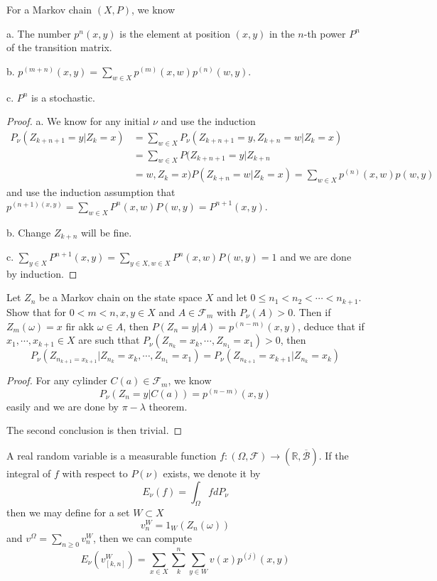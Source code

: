 \documentclass[lang=en, color=blue, ]{elegantbook}
\newcommand{\F}{\mathcal{F}}
\newcommand{\R}{\mathbb{R}}
\begin{document}
\begin{lemma}
    For a Markov chain $(X,P)$, we know\par
    a. The number $p^n(x,y)$ is the element at position $(x,y)$ in the $n$-th power $P^n$ of the transition matrix.\par
    b. $p^{(m+n)}(x,y) = \sum\limits_{w\in X}p^{(m)}(x,w)p^{(n)}(w,y)$.\par
    c. $P^n$ is a stochastic.
\end{lemma}
\begin{proof}
    a. We know for any initial $\nu$ and use the induction
    \[
    \begin{aligned}
    P_{\nu}(Z_{k+n+1} = y|Z_k = x) &= \sum\limits_{w\in X}P_{\nu}(Z_{k+n+1} =y, Z_{k+n} = w |Z_k = x) \\ &= \sum\limits_{w\in X}P(Z_{k+n+1} = y|Z_{k+n} \\ &= w, Z_k = x)P(Z_{k+n} = w|Z_k = x) = \sum\limits_{w\in X}p^{(n)}(x,w)p(w,y)
    \end{aligned}
    \]
    and use the induction assumption that $p^{(n+1)(x,y)} = \sum\limits_{w\in X} P^n(x,w)P(w,y) = P^{n+1}(x,y)$.\par
    b. Change $Z_{k+n}$ will be fine.\par
    c. $\sum\limits_{y\in X}P^{n+1}(x,y) = \sum\limits_{y\in X, w\in X} P^{n}(x,w)P(w,y) = 1$ and we are done by induction.
\end{proof}

\begin{proposition}
    Let $Z_n$ be a Markov chain on the state space $X$ and let $0\leq n_1<n_2<\cdots<n_{k+1}$. Show that for $0<m<n, x,y\in X$ and $A\in \F_m$ with $P_{\nu}(A) > 0$. Then if $Z_m(\omega) = x$ fir akk $\omega \in A$, then $P(Z_n = y|A) = p^{(n-m)}(x,y)$, deduce that if $x_1,\cdots,x_{k+1} \in X$ are such tthat $P_{\nu}(Z_{n_k} = x_k,\cdots,Z_{n_1} = x_1) > 0$, then
    \[P_{\nu}(Z_{n_{k+1} = x_{k+1}}|Z_{n_k} = x_k,\cdots,Z_{n_1} = x_1) = P_{\nu}(Z_{n_{k+1}} = x_{k+1}|Z_{n_k} = x_k)\]
\end{proposition}
\begin{proof}
    For any cylinder $C(a) \in \F_m$, we know
    \[
    P_\nu(Z_n = y|C(a)) = p^{(n-m)}(x,y)
    \]
    easily and we are done by $\pi-\lambda$ theorem.\par
    The second conclusion is then trivial.
\end{proof}

\begin{definition}
    A real random variable is a measurable function $f:(\Omega,\F) \to (\R,\overline{\mathcal{B}})$. If the integral of $f$ with respect to $P(\nu)$ exists, we denote it by
    \[
    E_{\nu}(f) = \int_{\Omega}fdP_{\nu}
    \]
    then we may define for a set $W\subset X$
    \[
    v_n^W = 1_{W}(Z_n(\omega))
    \]
    and $v^{\Omega} = \sum_{n\geq 0} v_n^W$, then we can compute
    \[
    E_\nu(v_{[k,n]}^W) = \sum\limits_{x\in X} \sum_k^n \sum_{y\in W} v(x)p^{(j)}(x,y)
    \]
\end{definition}
\end{document}
